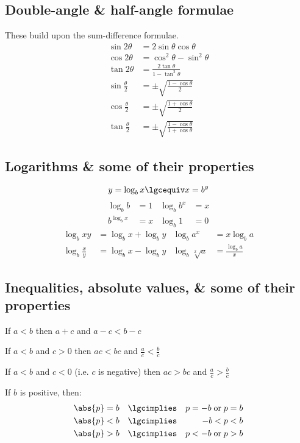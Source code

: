 \documentclass[10pt]{extarticle}
\theoremstyle{definition}
\begin{document}
\begin{multicols}{2}
		\subsection*{Double-angle \& half-angle formulae}
		These build upon the sum-difference formulae.
		\begin{align*}
			\sin{2\theta} &= 2\sin{\theta}\cos{\theta} \\
			\cos{2\theta} &= \cos^2{\theta} - \sin^2{\theta} \\
			\tan{2\theta} &= \frac{2\tan{\theta}}{1 - \tan^2\theta} \\
			\sin{\frac{\theta}{2}} &= \pm \sqrt{\frac{1 - \cos\theta}{2}} \\
			\cos{\frac{\theta}{2}} &= \pm \sqrt{\frac{1 + \cos\theta}{2}}\\
			\tan{\frac{\theta}{2}} &= \pm \sqrt{\frac{1 - \cos\theta}{1 + \cos\theta}}
		\end{align*}

		\subsection*{Logarithms \& some of their properties}
		\[y = \log_{b}x \lgcequiv x = b^{y}\]
		\begin{align*}
			\log_{b}{b} &= 1 & \log_{b}{b^x} &= x \\
			b^{\log_{b}{x}} &= x & \log_{b}{1} &= 0
		\end{align*}
		\begin{align*}
			\log_{b}{xy} &= \log_{b}{x} + \log_{b}{y} & \log_{b}{a^x} &= x \log_{b}{a} \\
			\log_{b}{\frac{x}{y}} &= \log_{b}{x} - \log_{b}{y} & \log_{b}{\sqrt[x]{a}} &= \frac{\log_{b}{a}}{x}
		\end{align*}

		\subsection*{Inequalities, absolute values, \& some of their properties}
		If \(a < b\) then \(a + c\) and \(a - c < b - c\)

		If \(a < b\) and \(c > 0\) then \(ac < bc\) and \(\frac{a}{c} < \frac{b}{c}\)

		If \(a < b\) and \(c < 0\) (i.e. \(c\) is negative) then \(ac > bc\) and \(\frac{a}{c} > \frac{b}{c}\)

		If \(b\) is positive, then:
		\begin{align*}
			\abs{p} &= b &\lgcimplies && p = -b \; \text{or} \; p = b \\
			\abs{p} &< b &\lgcimplies && -b < p < b \\
			\abs{p} &> b &\lgcimplies && p < -b \; \text{or} \; p > b
		\end{align*}
	\end{multicols}
	\pagebreak
\end{document}
